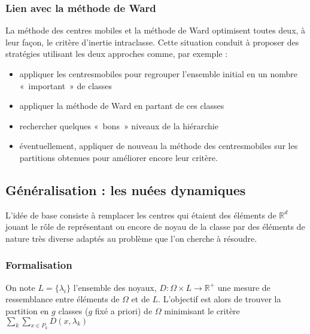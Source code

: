 \documentclass[letterpaper,10pt,french]{sphinxmanual}
\begin{document}
\subsubsection{Lien avec la méthode de Ward}
\label{\detokenize{clustering:lien-avec-la-methode-de-ward}}
\sphinxAtStartPar
La méthode des centres mobiles et la méthode de Ward optimisent toutes deux, à leur façon, le critère d’inertie intra\sphinxhyphen{}classe. Cette situation conduit à proposer des stratégies utilisant les deux approches comme, par exemple :
\begin{itemize}
\item {} 
\sphinxAtStartPar
appliquer les centres\sphinxhyphen{}mobiles pour regrouper l’ensemble initial en un nombre « important » de classes

\item {} 
\sphinxAtStartPar
appliquer la méthode de Ward en partant de ces classes

\item {} 
\sphinxAtStartPar
rechercher quelques « bons » niveaux de la hiérarchie

\item {} 
\sphinxAtStartPar
éventuellement, appliquer de nouveau la méthode des centres\sphinxhyphen{}mobiles sur les partitions obtenues pour améliorer encore leur critère.

\end{itemize}


\subsection{Généralisation : les nuées dynamiques}
\label{\detokenize{clustering:generalisation-les-nuees-dynamiques}}
\ignorespaces 
\sphinxAtStartPar
L’idée de base consiste à remplacer les centres   qui étaient des éléments de \(\mathbb{R}^d\) jouant le rôle de représentant ou encore de noyau de la classe par des éléments de nature très diverse adaptés au problème que l’on cherche à résoudre.


\subsubsection{Formalisation}
\label{\detokenize{clustering:formalisation}}
\sphinxAtStartPar
On note \(L=\{\lambda_i\}\) l’ensemble des noyaux, \(D:\Omega\times L\rightarrow \mathbb{R}^+\) une mesure de ressemblance entre éléments de \(\Omega\) et de \(L\). L’objectif est alors de trouver la partition en \(g\) classes (\(g\) fixé a priori) de \(\Omega\) minimisant le critère \(\displaystyle\sum_{k}\displaystyle\sum_{x\in P_k}D(x,\lambda_k)\)
\end{document}
